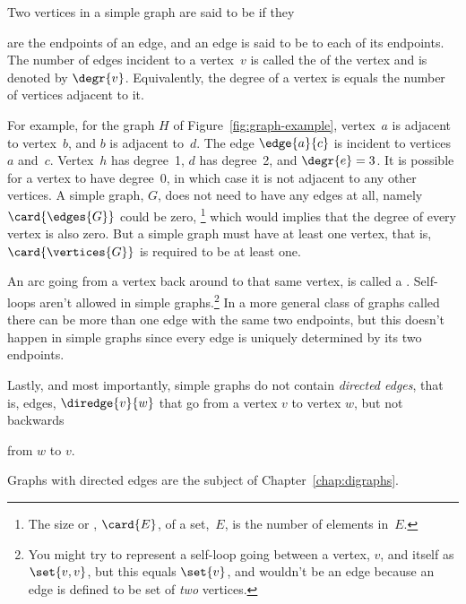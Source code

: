 \begin{definition}
Two vertices in a simple graph are said to be  if they
\begin{editingnotes}
\end{editingnotes} are the endpoints of an edge, and an edge is
said to be  to each of its endpoints.  The number of
edges incident to a vertex~$v$ is called the  of the
vertex and is denoted by $\degr{v}$.  Equivalently, the degree of a
vertex is equals the number of vertices adjacent to it.
\end{definition}
For example, for the graph $H$ of Figure~\ref{fig:graph-example},
vertex~$a$ is adjacent to vertex~$b$, and $b$ is adjacent to~$d$.  The
edge $\edge{a}{c}$ is incident to vertices $a$ and~$c$.  Vertex~$h$
has degree~1, $d$ has degree~2, and $\degr{e} = 3$.  It is possible
for a vertex to have degree~0, in which case it is not adjacent to any
other vertices.  A simple graph, $G$, does not need to have any edges
at all, namely $\card{\edges{G}}$ could be zero,
\footnote{The size or , $\card{E}$, of a set,~$E$,
  is the number of elements in~$E$.}  which would implies that the
degree of every vertex is also zero.  But a simple graph must have at
least one vertex, that is, $\card{\vertices{G}}$ is required to be at
least one.

An arc going from a vertex back around to that same vertex, is called a
.  Self-loops aren't allowed in simple
graphs.\footnote{You might try to represent a self-loop going between a
  vertex, $v$, and itself as $\set{v, v}$, but this equals $\set{v}$, and
  wouldn't be an edge because an edge is defined to be set of \emph{two}
  vertices.}  In a more general class of graphs called 
there can be more than one edge with the same two endpoints, but this
doesn't happen in simple graphs since every edge is uniquely determined by
its two endpoints.
\begin{editingnotes} 
\end{editingnotes} 
Lastly, and most importantly, simple graphs do not
contain \emph{directed edges}, that is, edges, $\diredge{v}{w}$ that go
from a vertex $v$ to vertex $w$, but not backwards 
\begin{editingnotes}
\end{editingnotes} from $w$ to $v$.  
\begin{editingnotes}
\end{editingnotes} Graphs with directed
edges are the subject of Chapter~\ref{chap:digraphs}.

